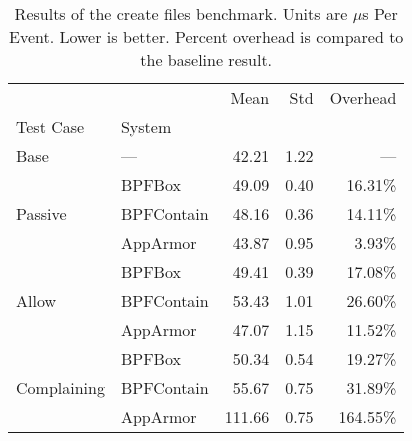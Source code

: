 \begin{table}[htp!]
\centering
\footnotesize
\caption[Results of the create files benchmark]{Results of the create files benchmark. Units are $\mu$s Per Event. Lower is better. Percent overhead is compared to the baseline result.}
\label{tab:phoronix-create-files}
\begin{tabular}{llrrr}
\toprule
            &          &    Mean &   Std &  Overhead \\
Test Case & System &         &       &           \\
\midrule
Base & --- &   42.21 &  1.22 &       --- \\
\cline{1-5}
\multirow{3}{*}{Passive} & BPFBox &   49.09 &  0.40 &   16.31\% \\
            & BPFContain &   48.16 &  0.36 &   14.11\% \\
            & AppArmor &   43.87 &  0.95 &    3.93\% \\
\cline{1-5}
\multirow{3}{*}{Allow} & BPFBox &   49.41 &  0.39 &   17.08\% \\
            & BPFContain &   53.43 &  1.01 &   26.60\% \\
            & AppArmor &   47.07 &  1.15 &   11.52\% \\
\cline{1-5}
\multirow{3}{*}{Complaining} & BPFBox &   50.34 &  0.54 &   19.27\% \\
            & BPFContain &   55.67 &  0.75 &   31.89\% \\
            & AppArmor &  111.66 &  0.75 &  164.55\% \\
\bottomrule
\end{tabular}
\end{table}
